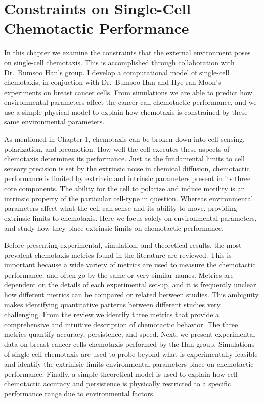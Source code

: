 
\chapter{Constraints on Single-Cell Chemotactic Performance}

In this chapter we examine the constraints that the external environment poses on single-cell chemotaxis. This is accomplished through collaboration with Dr.\ Bumsoo Han's group. I develop a computational model of single-cell chemotaxis, in conjuction with Dr.\ Bumsoo Han and Hye-ran Moon's experiments on breast cancer cells. From simulations we are able to predict how environmental parameters affect the cancer call chemotactic performance, and we use a simple physical model to explain how chemotaxis is constrained by these same environmental parameters.

As mentioned in Chapter 1, chemotaxis can be broken down into cell sensing, polarization, and locomotion. How well the cell executes these aspects of chemotaxis determines its performance. Just as the fundamental limits to cell sensory precision is set by the extrinsic noise in chemical diffusion, chemotactic performance is limited by extrinsic and intrinsic parameters present in its three core components. The ability for the cell to polarize and induce motility is an intrinsic property of the particular cell-type in question. Whereas environmental parameters affect what the cell can sense and its ability to move, providing extrinsic limits to chemotaxis. Here we focus solely on environmental parameters, and study how they place extrinsic limits on chemotactic performance.

Before presenting experimental, simulation, and theoretical results, the most prevalent chemotaxis metrics found in the literature are reviewed. This is important because a wide variety of metrics are used to measure the chemotactic performance, and often go by the same or very similar names. Metrics are dependent on the details of each experimental set-up, and it is frequently unclear how different metrics can be compared or related between studies. This ambiguity makes identifying quantitative patterns between different studies very challenging. From the review we identify three metrics that provide a comprehensive and intuitive description of chemotactic behavior.
The three metrics quantify accuracy, persistence, and speed. Next, we present experimental data on breast cancer cells chemotaxis performed by the Han group. Simulations of single-cell chemotaxis are used to probe beyond what is experimentally feasible and identify the extrinisic limits environmental parameters place on chemotactic performance. Finally, a simple theoretical model is used to explain how cell chemotactic accuracy and persistence is physically restricted to a specific performance range due to environmental factors.

